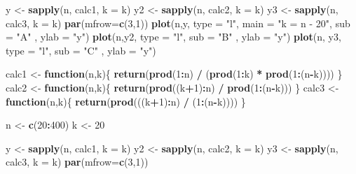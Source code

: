 \documentclass[
]{article}
\newenvironment{Shaded}{\begin{snugshade}}{\end{snugshade}}
\newcommand{\ControlFlowTok}[1]{\textcolor[rgb]{0.13,0.29,0.53}{\textbf{#1}}}
\newcommand{\DataTypeTok}[1]{\textcolor[rgb]{0.13,0.29,0.53}{#1}}
\newcommand{\DecValTok}[1]{\textcolor[rgb]{0.00,0.00,0.81}{#1}}
\newcommand{\KeywordTok}[1]{\textcolor[rgb]{0.13,0.29,0.53}{\textbf{#1}}}
\newcommand{\NormalTok}[1]{#1}
\newcommand{\OperatorTok}[1]{\textcolor[rgb]{0.81,0.36,0.00}{\textbf{#1}}}
\newcommand{\StringTok}[1]{\textcolor[rgb]{0.31,0.60,0.02}{#1}}
\begin{document}
\begin{Shaded}
\begin{Highlighting}[]
\NormalTok{y <-}\StringTok{  }\KeywordTok{sapply}\NormalTok{(n, calc1, }\DataTypeTok{k =}\NormalTok{ k)}
\NormalTok{y2 <-}\StringTok{  }\KeywordTok{sapply}\NormalTok{(n, calc2, }\DataTypeTok{k =}\NormalTok{ k)}
\NormalTok{y3 <-}\StringTok{  }\KeywordTok{sapply}\NormalTok{(n, calc3, }\DataTypeTok{k =}\NormalTok{ k)}
\KeywordTok{par}\NormalTok{(}\DataTypeTok{mfrow=}\KeywordTok{c}\NormalTok{(}\DecValTok{3}\NormalTok{,}\DecValTok{1}\NormalTok{))}
\KeywordTok{plot}\NormalTok{(n,y, }\DataTypeTok{type =} \StringTok{"l"}\NormalTok{, }\DataTypeTok{main =} \StringTok{"k = n - 20"}\NormalTok{, }\DataTypeTok{sub =}  \StringTok{"A"}\NormalTok{  , }\DataTypeTok{ylab =} \StringTok{"y"}\NormalTok{)}
\KeywordTok{plot}\NormalTok{(n,y2, }\DataTypeTok{type =} \StringTok{"l"}\NormalTok{, }\DataTypeTok{sub =}  \StringTok{"B"}\NormalTok{ , }\DataTypeTok{ylab =} \StringTok{"y"}\NormalTok{)}
\KeywordTok{plot}\NormalTok{(n, y3, }\DataTypeTok{type =} \StringTok{"l"}\NormalTok{, }\DataTypeTok{sub =}  \StringTok{"C"}\NormalTok{ , }\DataTypeTok{ylab =} \StringTok{"y"}\NormalTok{)}

\NormalTok{calc1 <-}\StringTok{ }\ControlFlowTok{function}\NormalTok{(n,k)\{}
 \KeywordTok{return}\NormalTok{(}\KeywordTok{prod}\NormalTok{(}\DecValTok{1}\OperatorTok{:}\NormalTok{n) }\OperatorTok{/}\StringTok{ }\NormalTok{(}\KeywordTok{prod}\NormalTok{(}\DecValTok{1}\OperatorTok{:}\NormalTok{k) }\OperatorTok{*}\StringTok{ }\KeywordTok{prod}\NormalTok{(}\DecValTok{1}\OperatorTok{:}\NormalTok{(n}\OperatorTok{-}\NormalTok{k)))) }
\NormalTok{\}}
\NormalTok{calc2 <-}\StringTok{ }\ControlFlowTok{function}\NormalTok{(n,k)\{}
 \KeywordTok{return}\NormalTok{(}\KeywordTok{prod}\NormalTok{((k}\OperatorTok{+}\DecValTok{1}\NormalTok{)}\OperatorTok{:}\NormalTok{n) }\OperatorTok{/}\StringTok{ }\KeywordTok{prod}\NormalTok{(}\DecValTok{1}\OperatorTok{:}\NormalTok{(n}\OperatorTok{-}\NormalTok{k))) }
\NormalTok{\}}
\NormalTok{calc3 <-}\StringTok{ }\ControlFlowTok{function}\NormalTok{(n,k)\{}
 \KeywordTok{return}\NormalTok{(}\KeywordTok{prod}\NormalTok{(((k}\OperatorTok{+}\DecValTok{1}\NormalTok{)}\OperatorTok{:}\NormalTok{n) }\OperatorTok{/}\StringTok{ }\NormalTok{(}\DecValTok{1}\OperatorTok{:}\NormalTok{(n}\OperatorTok{-}\NormalTok{k)))) }
\NormalTok{\}}

\NormalTok{n <-}\StringTok{ }\KeywordTok{c}\NormalTok{(}\DecValTok{20}\OperatorTok{:}\DecValTok{400}\NormalTok{)}
\NormalTok{k <-}\StringTok{ }\DecValTok{20}

\NormalTok{y <-}\StringTok{  }\KeywordTok{sapply}\NormalTok{(n, calc1, }\DataTypeTok{k =}\NormalTok{ k)}
\NormalTok{y2 <-}\StringTok{  }\KeywordTok{sapply}\NormalTok{(n, calc2, }\DataTypeTok{k =}\NormalTok{ k)}
\NormalTok{y3 <-}\StringTok{  }\KeywordTok{sapply}\NormalTok{(n, calc3, }\DataTypeTok{k =}\NormalTok{ k)}
\KeywordTok{par}\NormalTok{(}\DataTypeTok{mfrow=}\KeywordTok{c}\NormalTok{(}\DecValTok{3}\NormalTok{,}\DecValTok{1}\NormalTok{))}


\end{Highlighting}
\end{Shaded}
\end{document}
